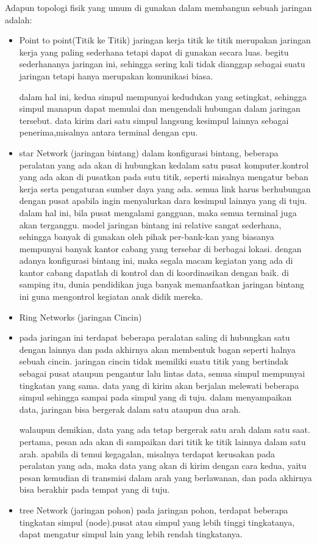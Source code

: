Adapun topologi fisik yang umum di gunakan dalam membangun sebuah jaringan adalah:
\begin{itemize}
  \item Point to point(Titik ke Titik)
        jaringan kerja titik ke titik merupakan jaringan kerja yang paling sederhana tetapi dapat di gunakan secara luas. begitu sederhananya jaringan ini, sehingga sering kali tidak dianggap sebagai suatu jaringan tetapi hanya merupakan komunikasi biasa.

        dalam hal ini, kedua simpul mempunyai kedudukan yang setingkat, sehingga simpul manapun dapat memulai dan mengendali hubungan dalam jaringan tersebut. data kirim dari satu simpul langsung kesimpul lainnya sebagai penerima,misalnya antara terminal dengan cpu.
  \item  star Network (jaringan bintang)
         dalam konfigurasi bintang, beberapa peralatan yang ada akan di hubungkan kedalam satu pusat komputer.kontrol yang ada akan di pusatkan pada sutu titik, seperti misalnya mengatur beban kerja serta pengaturan sumber daya yang ada. semua link harus berhubungan dengan pusat apabila ingin menyalurkan dara kesimpul lainnya yang di tuju. dalam hal ini, bila pusat mengalami gangguan, maka semua terminal juga akan terganggu. model jaringan bintang ini relative sangat sederhana, sehingga banyak di gunakan oleh pihak per-bank-kan yang biasanya mempunyai banyak kantor cabang yang tersebar di berbagai lokasi. dengan adanya konfigurasi bintang ini, maka segala macam kegiatan yang ada di kantor cabang dapatlah di kontrol dan di koordinasikan dengan baik. di samping itu, dunia pendidikan juga banyak memanfaatkan jaringan bintang ini guna mengontrol kegiatan anak didik mereka.
  \item Ring Networks (jaringan Cincin)
  \item    pada jaringan ini terdapat beberapa peralatan saling
        di hubungkan satu dengan lainnya dan pada akhirnya akan membentuk bagan seperti halnya sebuah cincin. jaringan cincin tidak memiliki suatu titik yang bertindak sebagai pusat ataupun pengantur lalu lintas data, semua simpul mempunyai tingkatan yang sama. data yang di kirim akan berjalan melewati beberapa simpul sehingga sampai pada simpul yang di tuju. dalam menyampaikan data, jaringan bisa bergerak dalam satu ataupun dua arah.

        walaupun demikian, data yang ada tetap bergerak satu arah dalam satu saat. pertama, pesan ada akan di sampaikan dari titik ke titik lainnya dalam satu arah. apabila di temui kegagalan, misalnya terdapat kerusakan pada peralatan yang ada, maka data yang akan di kirim dengan cara kedua, yaitu pesan kemudian di transmisi dalam arah yang berlawanan, dan pada akhirnya bisa berakhir pada tempat yang di tuju.
  \item tree Network (jaringan pohon)
        pada jaringan pohon, terdapat beberapa tingkatan simpul (node).pusat atau simpul yang lebih tinggi tingkatanya, dapat mengatur simpul lain yang lebih rendah tingkatanya.
\end{itemize} 
